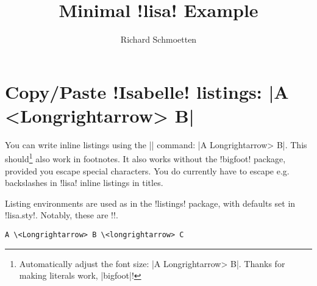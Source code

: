 \documentclass[]{article}
\title{Minimal \lisa!lisa! Example}
\author{Richard Schmoetten}
\begin{document}
\maketitle

\section{Copy/Paste \lisa!Isabelle! listings: \lisa|A \\<Longrightarrow> B|}

You can write inline listings using the \lisa|\lisa| command: \lisa|A \<Longrightarrow> B|. This should\footnote{Automatically adjust the font size: \lisa|A \<Longrightarrow> B|. Thanks for making literals work, \lisa|bigfoot|!} also work in footnotes. It also works without the \lisa!bigfoot! package, provided you escape special characters. You do currently have to escape e.g. backslashes in \lisa!lisa! inline listings in titles.

Listing environments are used as in the \lisa!listings! package, with defaults set in \lisa!lisa.sty!. Notably, these are \lisa!\footnotesize!.
\begin{lstlisting}
A \<Longrightarrow> B \<longrightarrow> C
\end{lstlisting}
\end{document}
